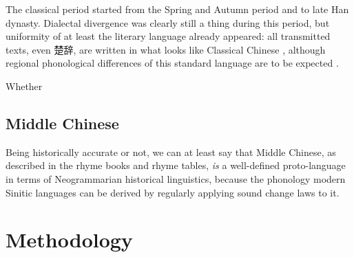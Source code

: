 \documentclass[UTF8, a4paper, oneside, scheme=plain, 12pt]{ctexrep}
\newcommand*{\citepage}[1]{p.~{#1}}
\begin{document}
The classical period started from the Spring and Autumn period and to late Han dynasty.
Dialectal divergence was clearly still a thing during this period,
but uniformity of at least the literary language already appeared:
all transmitted texts, even 楚辞, are written in what looks like Classical Chinese
\citep[\citepage{447}]{harbsmeier2016irrefutable},
although regional phonological differences of this standard language are to be expected \citep[\citepage{488}]{harbsmeier2016irrefutable}.

Whether 

\subsection{Middle Chinese}

Being historically accurate or not, we can at least say that Middle Chinese, as described in the rhyme books and rhyme tables,
\emph{is} a well-defined proto-language in terms of Neogrammarian historical linguistics,
because the phonology modern Sinitic languages can be derived by regularly applying sound change laws to it.


\section{Methodology}
\end{document}
